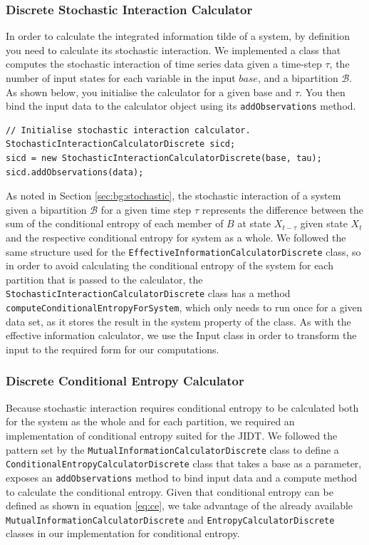 \documentclass[a4paper,11pt]{article}
\begin{document}
\subsubsection{Discrete Stochastic Interaction Calculator}
\label{sec:impl:stochastic}

In order to calculate the integrated information tilde of a system, by definition you need to calculate its stochastic interaction. We implemented a class that computes the stochastic interaction of time series data given a time-step $\tau$, the number of input states for each variable in the input $base$, and a bipartition $\mathcal{B}$. As shown below, you initialise the calculator for a given base and $\tau$. You then bind the input data to the calculator object using its \texttt{addObservations} method.

\begin{verbatim}
// Initialise stochastic interaction calculator.
StochasticInteractionCalculatorDiscrete sicd;
sicd = new StochasticInteractionCalculatorDiscrete(base, tau);
sicd.addObservations(data);
\end{verbatim}

As noted in Section \ref{sec:bg:stochastic}, the stochastic interaction of a system given a bipartition $\mathcal{B}$ for a given time step $\tau$ represents the difference between the sum of the conditional entropy of each member of $B$ at state $X_{t-\tau}$ given state $X_t$ and the respective conditional entropy for system as a whole. We followed the same structure used for the \texttt{EffectiveInformationCalculatorDiscrete} class, so in order to avoid calculating the conditional entropy of the system for each partition that is passed to the calculator, the \texttt{StochasticInteractionCalculatorDiscrete} class has a method \texttt{computeConditionalEntropyForSystem}, which only needs to run once for a given data set, as it stores the result in the system property of the class. As with the effective information calculator, we use the Input class in order to transform the input to the required form for our computations.

\subsubsection{Discrete Conditional Entropy Calculator}

Because stochastic interaction requires conditional entropy to be calculated both for the system as the whole and for each partition, we required an implementation of conditional entropy suited for the JIDT. We followed the pattern set by the \texttt{MutualInformationCalculatorDiscrete} class to define a \texttt{ConditionalEntropyCalculatorDiscrete} class that takes a base as a parameter, exposes an \texttt{addObservations} method to bind input data and a compute method to calculate the conditional entropy. Given that conditional entropy can be defined as shown in equation \ref{eq:ce}, we take advantage of the already available \texttt{MutualInformationCalculatorDiscrete} and \texttt{EntropyCalculatorDiscrete} classes in our implementation for conditional entropy.
\end{document}
